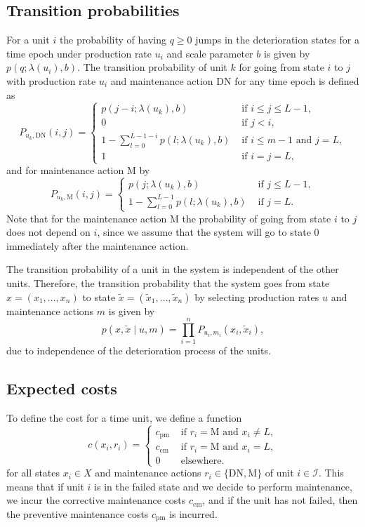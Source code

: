 \documentclass[a4paper,12pt]{article}
\begin{document}
\subsection{Transition probabilities}
For a unit $i$ the probability of having $q \geq 0$ jumps in the deterioration states for a time epoch under production rate $u_i$ and scale parameter $b$ is given by $p(q; \lambda(u_i), b)$. The transition probability of unit $k$ for going from state $i$ to $j$ with production rate $u_i$ and maintenance action DN for any time epoch is defined as
$$
P_{u_k,\text{DN}}(i,j) = \begin{cases}
p(j-i; \lambda(u_k), b) &\text{ if } i \leq j \leq L-1, \\
0 &\text{ if } j < i, \\
1 - \sum_{l=0}^{L-1-i}p(l; \lambda(u_k), b) & \text{ if } i \leq m-1  \text{ and } j = L, \\
1 & \text{ if } i = j = L,
\end{cases}
$$
and for maintenance action M by
$$
P_{u_k,\text{M}}(i,j) = \begin{cases}
p(j; \lambda(u_k), b)&\text{ if } j \leq  L-1, \\
1 - \sum_{l=0}^{L-1}p(l; \lambda(u_k), b) & \text{ if } j = L.
\end{cases}
$$
Note that for the maintenance action M the probability of going from state $i$ to $j$ does not depend on $i$, since we assume that the system will go to state 0 immediately after the maintenance action.

The transition probability of a unit in the system is independent of the other units. Therefore, the transition probability that the system goes from state $x = (x_1, \dots, x_n)$ to state $\tilde{x} = (\tilde{x}_1, \dots, \tilde{x}_n)$ by selecting production rates $u$ and maintenance actions $m$ is given by
$$
p(x, \tilde{x} \mid u, m) = \prod_{i = 1}^nP_{u_i,m_i}(x_i, \tilde{x}_i),
$$
due to independence of the deterioration process of the units.

\subsection{Expected costs}
To define the cost for a time unit, we define a function
$$
c(x_i,r_i) = \begin{cases}
c_{\text{pm}} & \text{ if } r_i = \text{M} \text{ and } x_i \neq L, \\
c_{\text{cm}} & \text{ if } r_i = \text{M} \text{ and } x_i = L, \\
0 & \text{ elsewhere}.
\end{cases}
$$
for all states $x_i \in X$ and maintenance actions $r_i \in \{\text{DN}, \text{M}\}$ of unit $i \in \mathcal{I}$. This means that if unit $i$ is in the failed state and we decide to perform maintenance, we incur the corrective maintenance costs $c_{\text{cm}}$, and if the unit has not failed, then the preventive maintenance costs $c_{\text{pm}}$ is incurred. 
\end{document}
